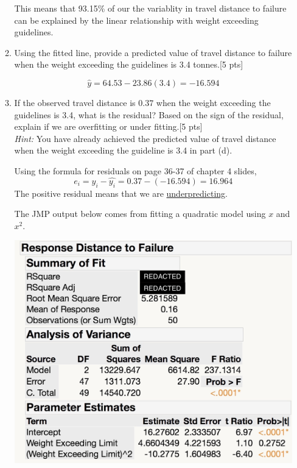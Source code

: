 \documentclass[11pt]{article}\usepackage[]{graphicx}\usepackage[]{color}
\begin{document}
\begin{enumerate}
\begin{enumerate}
       This means that 93.15\% of our the variablity in travel distance to failure can be explained by the linear relationship with weight exceeding guidelines.
      
      
      \item Using the fitted line, provide a predicted value of travel distance to failure when the weight exceeding the guidelines is 3.4 tonnes.[5 pts]
      
               $$ \hat{y} = 64.53 -23.86(3.4) = -16.594 $$

      \item If the observed travel distance is $0.37$ when the weight exceeding the guidelines is 3.4, what is the residual? Based on the sign of the residual, explain if we are overfitting or under fitting.[5 pts]\\
      

      \emph{Hint:} You have already achieved the predicted value of travel distance when the weight exceeding the guideline is 3.4 in part (d).
      
      
      Using the formula for residuals on page 36-37 of chapter 4 slides, 
            $$ e_{i} = y_i - \hat{y_i}= 0.37 - (-16.594)= 16.964 $$
        The positive residual means that we are  \underline{underpredicting}.    
      

%
\vspace{0.3cm}
The JMP output below comes from fitting a quadratic model using $x$ and $x^2$.
\vspace{0.3cm}
    
    \includegraphics[scale=.2]{FitModel}


\end{enumerate}
\end{enumerate}
\end{document}
